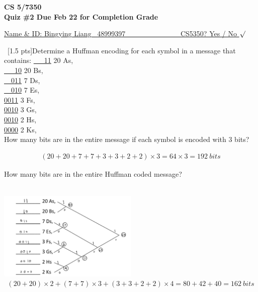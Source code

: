 \documentclass[12pt]{article}
\newenvironment{sol}[1][Solution]{\begin{trivlist}\item[\hskip\labelsep {\bfseries #1:}]}{\end{trivlist}}
\begin{document}
\renewcommand{\qedsymbol}{\filledbox}
\begin{center}
    \textbf{CS 5/7350} \\
    \textbf{Quiz \#2 Due Feb 22 for Completion Grade}
\end{center}
\begin{flushright}
\underline{Name \& ID: Bingying Liang \ 
48999397 \ \ \ \ \ \ \ \ \ \ \ \ \ \ \ CS5350? Yes / No $\surd$}
\end{flushright}

\begin{enumerate}
    \item \ [1.5 pts]Determine a Huffman encoding for each symbol in a message that contains:
    \underline{\ \ \ 11} 20 As, \\
    \underline{\ \ \ 10} 20 Bs, \\
    \underline{\ \ 011} 7 Ds, \\
    \underline{\ \ 010} 7 Es, \\
    \underline{0011} 3 Fs, \\
    \underline{0010} 3 Gs, \\
    \underline{0010} 2 Hs, \\
    \underline{0000} 2 Ks, \\
    
    How many bits are in the entire message if each symbol is encoded with 3 bits?
    \begin{sol}
    \begin{align*}
        (20+20+7+7+3+3+2+2) \times 3 = 64 \times 3 = 192 \ bits
    \end{align*}
    \end{sol}
    How many bits are in the entire Huffman coded message?
    \begin{sol}
    \hspace*{\fill}\\
        \includegraphics[width=0.5\textwidth]{p2.jpg}
        \begin{align*}
            (20+20) \times 2 + (7+7) \times 3 + (3+3+2+2)\times 4 = 80 + 42 + 40 = 162 \ bits  
        \end{align*}
    \end{sol}


\end{enumerate}
\end{document}
